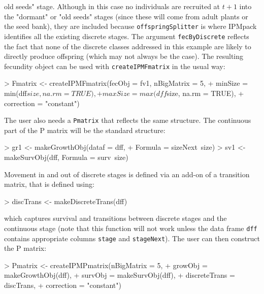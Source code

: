 \documentclass{article}
\begin{document}
old seeds" stage. Although in this case no individuals are recruited at $t+1$
into the "dormant" or "old seeds" stages (since these will come from adult
plants or the seed bank), they are included because {\tt offspringSplitter} is
where IPMpack identifies all the existing discrete stages. The argument {\tt fecByDiscrete} reflects the fact that none of the discrete classes addressed in this example are likely to directly produce offspring (which may not always be the case). The resulting fecundity object can be used with {\tt createIPMFmatrix} in the usual way:
\begin{Schunk}
\begin{Sinput}
> Fmatrix <- createIPMFmatrix(fecObj = fv1, nBigMatrix = 5, 
+                             minSize = min(dff$size, na.rm = TRUE), 
+                             maxSize = max(dff$size, na.rm = TRUE), 
+                             correction = "constant")
\end{Sinput}
\end{Schunk}
The user also needs a {\tt Pmatrix} that reflects the same structure. The
continuous part of the P matrix will be the standard structure:
\begin{Schunk}
\begin{Sinput}
> gr1 <- makeGrowthObj(dataf = dff, 
+                       Formula = sizeNext~size)
> sv1 <- makeSurvObj(dff,  Formula = surv~size)
\end{Sinput}
\end{Schunk}
Movement in and out of discrete stages is defined via an add-on of a transition matrix, that is defined using: 
\begin{Schunk}
\begin{Sinput}
> discTrans <- makeDiscreteTrans(dff)
\end{Sinput}
\end{Schunk}
which captures survival and transitions between discrete stages and the
continuous stage (note that this function will not work unless the data frame
{\tt dff} contains appropriate columns {\tt stage} and {\tt stageNext}).  The
user can then construct the P matrix:
\begin{Schunk}
\begin{Sinput}
> Pmatrix <- createIPMPmatrix(nBigMatrix = 5, 	
+                             growObj = makeGrowthObj(dff), 
+                             survObj = makeSurvObj(dff), 
+                             discreteTrans = discTrans, 
+                             correction = "constant")
\end{Sinput}
\end{Schunk}
\end{document}
